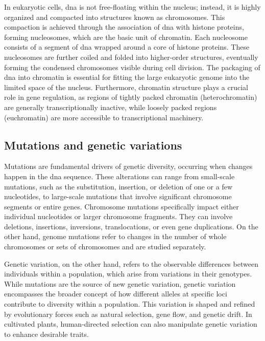 In eukaryotic cells, \ac{dna} is not free-floating within the nucleus; instead, it is highly organized and compacted into structures known as chromosomes. This compaction is achieved through the association of \ac{dna} with histone proteins, forming nucleosomes, which are the basic unit of chromatin. Each nucleosome consists of a segment of \ac{dna} wrapped around a core of histone proteins. These nucleosomes are further coiled and folded into higher-order structures, eventually forming the condensed chromosomes visible during cell division. The packaging of \ac{dna} into chromatin is essential for fitting the large eukaryotic genome into the limited space of the nucleus. Furthermore, chromatin structure plays a crucial role in gene regulation, as regions of tightly packed chromatin (heterochromatin) are generally transcriptionally inactive, while loosely packed regions (euchromatin) are more accessible to transcriptional machinery. \cite{Minchin2019}

\subsection{Mutations and genetic variations}

Mutations are fundamental drivers of genetic diversity, occurring when changes happen in the \ac{dna} sequence. These alterations can range from small-scale mutations, such as the substitution, insertion, or deletion of one or a few nucleotides, to large-scale mutations that involve significant chromosome segments or entire genes. Chromosome mutations specifically impact either individual nucleotides or larger chromosome fragments. They can involve deletions, insertions, inversions, translocations, or even gene duplications. On the other hand, genome mutations refer to changes in the number of whole chromosomes or sets of chromosomes and are studied separately. \cite{merrick2016}

Genetic variation, on the other hand, refers to the observable differences between individuals within a population, which arise from variations in their genotypes. While mutations are the source of new genetic variation, genetic variation encompasses the broader concept of how different alleles at specific loci contribute to diversity within a population. This variation is shaped and refined by evolutionary forces such as natural selection, gene flow, and genetic drift. In cultivated plants, human-directed selection can also manipulate genetic variation to enhance desirable traits. \cite{merrick2016}

